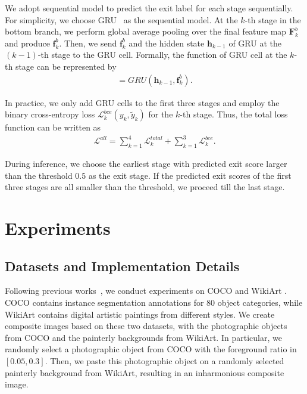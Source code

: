 \documentclass[letterpaper]{article} %
\begin{document}
We adopt sequential model to predict the exit label for each stage sequentially. For simplicity, we choose GRU~\cite{cho2014properties} as the sequential model. At the $k$-th stage in the bottom branch, we perform global average pooling over the final feature map $\bm{F}^b_k$ and produce $\bm{f}^b_k$. Then, we send $\bm{f}^b_k$ and the hidden state $\bm{h}_{k-1}$ of GRU at the $(k\!-\!1)$-th stage to the GRU cell. Formally, the function of GRU cell at the $k$-th stage can be represented by
\begin{eqnarray}
[\tilde{y}_k, \bm{h}_k] = GRU(\bm{h}_{k-1}, \bm{f}^b_k). 
\end{eqnarray}

In practice, we only add GRU cells to the first three stages and employ the binary cross-entropy loss $\mathcal{L}^{bce}_k(y_k, \tilde{y}_k)$ for the $k$-th stage. Thus, the total loss function can be written as
\begin{eqnarray}
\mathcal{L}^{all} = \sum_{k=1}^4 \mathcal{L}_k^{total} + \sum_{k=1}^3 \mathcal{L}^{bce}_k.
\end{eqnarray}

During inference, we choose the earliest stage with predicted exit score larger than the threshold $0.5$ as the exit stage. If the predicted exit scores of the first three stages are all smaller than the threshold, we proceed till the last stage. 



\section{Experiments}


\subsection{Datasets and Implementation Details} \label{sec:imp_detail}

Following previous works~\cite{peng2019element,cao2022painterly}, we conduct experiments on COCO \cite{lin2014microsoft} and WikiArt \cite{nichol2016painter}.
COCO \cite{lin2014microsoft} contains instance segmentation annotations for 80 object categories, while WikiArt \cite{nichol2016painter} contains digital artistic paintings from different styles.
We create composite images based on these two datasets, with the photographic objects from COCO and the painterly backgrounds from WikiArt.
In particular, we randomly select a photographic object from COCO with the foreground ratio in $[0.05, 0.3]$. Then, we paste this photographic object on a randomly selected painterly background from WikiArt, resulting in an inharmonious composite image. %
\end{document}
